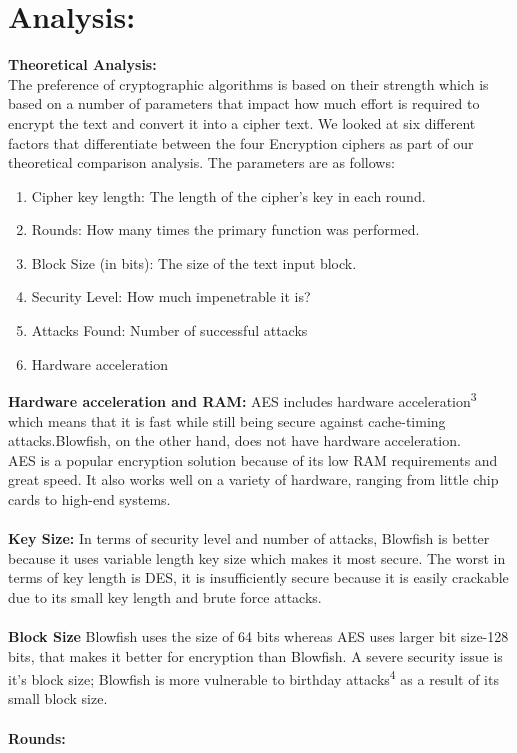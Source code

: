 \documentclass[a4paper]{report} %
\begin{document}
\section{Analysis:}
\textbf{Theoretical Analysis:}\\
The preference of cryptographic algorithms is based on their strength which is based on a number of parameters that impact how much effort is required to encrypt the text and convert it into a cipher text. We looked at six different factors that  differentiate between the four Encryption  ciphers as part of our theoretical comparison analysis. The parameters are as follows:
\begin{enumerate}
    \item Cipher key length: The length of the cipher's key in each round.
    \item Rounds: How many times the primary function was performed.
    \item Block Size (in bits): The size of the text input block.
    \item Security Level: How much impenetrable it is?
    \item Attacks Found: Number of successful attacks
    \item Hardware acceleration
\end{enumerate}
\textbf{Hardware acceleration and RAM:}
    AES includes hardware acceleration\textsuperscript{3} which means that it is fast while still being secure against cache-timing attacks.Blowfish, on the other hand, does not have hardware acceleration.\\
    AES is a popular encryption solution because of its low RAM requirements and great speed. It also works well on a variety of hardware, ranging from little chip cards to high-end systems.\\ \\
\textbf{Key Size:}
In terms of security level and number of attacks, Blowfish is better because it uses variable length key size which makes it most secure. The worst in terms of key length is DES, it is insufficiently secure because it is easily crackable due to its small key length and brute force attacks.\\ \\
\textbf{Block Size}
Blowfish uses the size of 64 bits whereas AES uses larger bit size-128 bits, that makes it better for encryption than Blowfish. A severe security issue is it's block size; Blowfish is more vulnerable to birthday attacks\textsuperscript{4} as a result of its small block size.\\ \\ \textbf{Rounds:}
\end{document}
